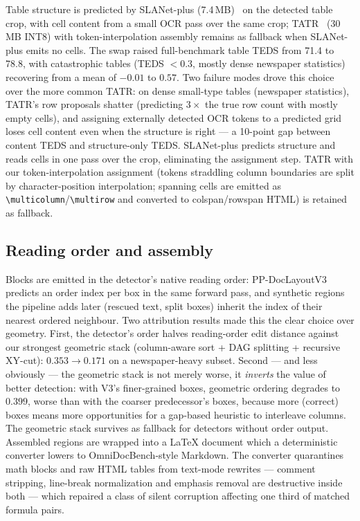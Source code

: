 Table structure is predicted by SLANet-plus (7.4\,MB)~\cite{slanet} on the detected table crop, with cell content from a small OCR pass over the same crop; TATR~\cite{tatr} (30\,MB INT8) with token-interpolation assembly remains as fallback when SLANet-plus emits no cells. The swap raised full-benchmark table TEDS from 71.4 to 78.8, with catastrophic tables (TEDS $<$0.3, mostly dense newspaper statistics) recovering from a mean of $-0.01$ to $0.57$. Two failure modes drove this choice over the more common TATR: on dense small-type tables (newspaper statistics), TATR's row proposals shatter (predicting $3\times$ the true row count with mostly empty cells), and assigning externally detected OCR tokens to a predicted grid loses cell content even when the structure is right --- a 10-point gap between content TEDS and structure-only TEDS. SLANet-plus predicts structure and reads cells in one pass over the crop, eliminating the assignment step. TATR with our token-interpolation assignment (tokens straddling column boundaries are split by character-position interpolation; spanning cells are emitted as \verb|\multicolumn|/\verb|\multirow| and converted to colspan/rowspan HTML) is retained as fallback.

\subsection{Reading order and assembly}
\label{sec:assembly}

Blocks are emitted in the detector's native reading order: PP-DocLayoutV3 predicts an order index per box in the same forward pass, and synthetic regions the pipeline adds later (rescued text, split boxes) inherit the index of their nearest ordered neighbour. Two attribution results made this the clear choice over geometry. First, the detector's order halves reading-order edit distance against our strongest geometric stack (column-aware sort + DAG splitting + recursive XY-cut): $0.353 \rightarrow 0.171$ on a newspaper-heavy subset. Second --- and less obviously --- the geometric stack is not merely worse, it \emph{inverts} the value of better detection: with V3's finer-grained boxes, geometric ordering degrades to $0.399$, worse than with the coarser predecessor's boxes, because more (correct) boxes means more opportunities for a gap-based heuristic to interleave columns. The geometric stack survives as fallback for detectors without order output. Assembled regions are wrapped into a \LaTeX{} document which a deterministic converter lowers to OmniDocBench-style Markdown. The converter quarantines math blocks and raw HTML tables from text-mode rewrites --- comment stripping, line-break normalization and emphasis removal are destructive inside both --- which repaired a class of silent corruption affecting one third of matched formula pairs.

